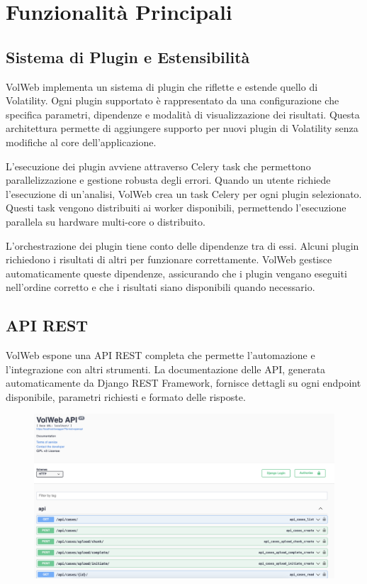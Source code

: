 \section{Funzionalità Principali}

\subsection{Sistema di Plugin e Estensibilità}

VolWeb implementa un sistema di plugin che riflette e estende quello di Volatility. Ogni plugin supportato è rappresentato da una configurazione che specifica parametri, dipendenze e modalità di visualizzazione dei risultati. Questa architettura permette di aggiungere supporto per nuovi plugin di Volatility senza modifiche al core dell'applicazione.

L'esecuzione dei plugin avviene attraverso Celery task che permettono parallelizzazione e gestione robusta degli errori. Quando un utente richiede l'esecuzione di un'analisi, VolWeb crea un task Celery per ogni plugin selezionato. Questi task vengono distribuiti ai worker disponibili, permettendo l'esecuzione parallela su hardware multi-core o distribuito.

L'orchestrazione dei plugin tiene conto delle dipendenze tra di essi. Alcuni plugin richiedono i risultati di altri per funzionare correttamente. VolWeb gestisce automaticamente queste dipendenze, assicurando che i plugin vengano eseguiti nell'ordine corretto e che i risultati siano disponibili quando necessario.

\subsection{API REST}

VolWeb espone una API REST completa che permette l'automazione e l'integrazione con altri strumenti. La documentazione delle API, generata automaticamente da Django REST Framework, fornisce dettagli su ogni endpoint disponibile, parametri richiesti e formato delle risposte.

\begin{figure}[H]
    \centering
    \includegraphics[width=1\linewidth]{images/volweb-original/volweb-swagger.png}
\end{figure}

